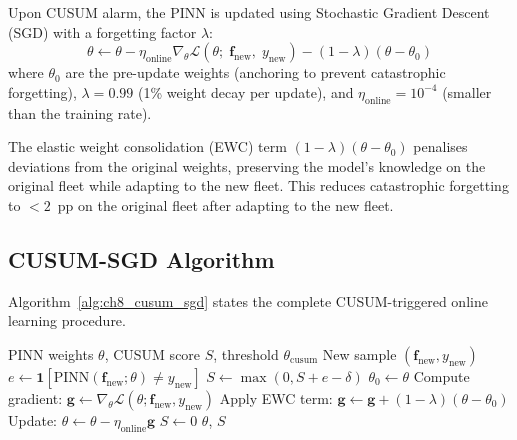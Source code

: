 Upon CUSUM alarm, the PINN is updated using Stochastic Gradient Descent
(SGD) with a forgetting factor $\lambda$:
\begin{equation}
  \theta \leftarrow \theta - \eta_\mathrm{online}
    \nabla_\theta \mathcal{L}(\theta;\; \mathbf{f}_\mathrm{new},\; y_\mathrm{new})
    - (1 - \lambda)(\theta - \theta_0)
  \label{eq:ch8_sgd_update}
\end{equation}
where $\theta_0$ are the pre-update weights (anchoring to prevent
catastrophic forgetting), $\lambda = 0.99$ (1\% weight decay per update),
and $\eta_\mathrm{online} = 10^{-4}$ (smaller than the training rate).

The elastic weight consolidation (EWC) term $(1 - \lambda)(\theta - \theta_0)$
penalises deviations from the original weights, preserving the model's
knowledge on the original fleet while adapting to the new fleet.
This reduces catastrophic forgetting to $< 2$~pp on the original fleet
after adapting to the new fleet.

\subsection{CUSUM-SGD Algorithm}

Algorithm~\ref{alg:ch8_cusum_sgd} states the complete CUSUM-triggered
online learning procedure.

\begin{algorithm}[htbp]
\caption{CUSUM-Triggered Online Learning}
\label{alg:ch8_cusum_sgd}
\begin{algorithmic}[1]
\Require PINN weights $\theta$, CUSUM score $S$, threshold $\theta_\mathrm{cusum}$
\Require New sample $(\mathbf{f}_\mathrm{new}, y_\mathrm{new})$
\State $e \leftarrow \mathbf{1}[\mathrm{PINN}(\mathbf{f}_\mathrm{new}; \theta) \neq y_\mathrm{new}]$
\State $S \leftarrow \max(0, S + e - \delta)$ 
 
  \State $\theta_0 \leftarrow \theta$ 
    \State Compute gradient: $\mathbf{g} \leftarrow \nabla_\theta \mathcal{L}(\theta; \mathbf{f}_\mathrm{new}, y_\mathrm{new})$
    \State Apply EWC term: $\mathbf{g} \leftarrow \mathbf{g} + (1-\lambda)(\theta - \theta_0)$
    \State Update: $\theta \leftarrow \theta - \eta_\mathrm{online} \mathbf{g}$
  \EndFor
  \State $S \leftarrow 0$ 
\EndIf
\State \Return $\theta$, $S$
\end{algorithmic}
\end{algorithm}

